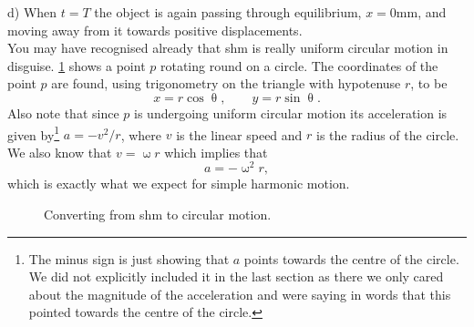 d) When $t=T$ the object is again passing through equilibrium, $x=0\text{mm}$, and moving away from it towards positive displacements.\\

You may have recognised already that shm is really uniform circular motion in disguise. \cref{fig: shm circle} shows a point $p$ rotating round on a circle. The coordinates of the point $p$ are found, using trigonometry on the triangle with hypotenuse $r$, to be
\begin{equation*}
x=r\cos\uptheta, \qquad y=r\sin\uptheta.
\end{equation*}
Also note that since $p$ is undergoing uniform circular motion its acceleration is given by\footnote{The minus sign is just showing that $a$ points towards the centre of the circle. We did not explicitly included it in the last section as there we only cared about the magnitude of the acceleration and were saying in words that this pointed towards the centre of the circle.} $a=-v^{2}/r$, where $v$ is the linear speed and $r$ is the radius of the circle. We also know that $v=\upomega r$ which implies that
\begin{equation*}
a=-\upomega^{2}r,
\end{equation*}
which is exactly what we expect for simple harmonic motion.

\begin{figure}[ht]
    \centering
    \caption{Converting from shm to circular motion.}
        \label{fig: shm circle}
\end{figure}

